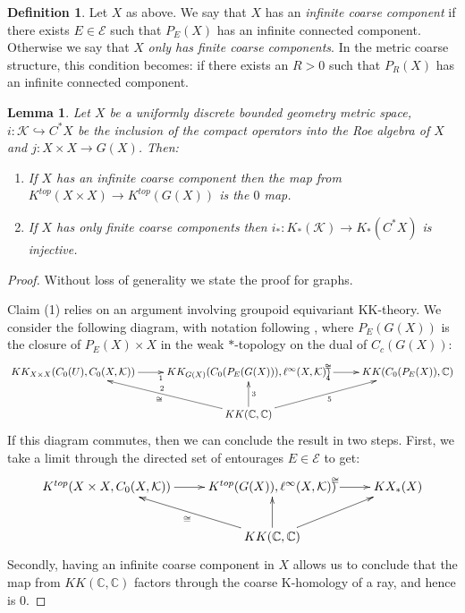 \documentclass[11pt]{amsart}
\theoremstyle{plain}
\newtheorem{lemma}[theorem]{Lemma}%
\theoremstyle{definition}%
\newtheorem{definition}[theorem]{Definition}%
\theoremstyle{remark}%
\begin{document}
{\begin{definition}
Let $X$ as above. We say that $X$ has an \textit{infinite coarse component} if there exists $E \in \mathcal{E}$ such that $P_{E}(X)$ has an infinite connected component. Otherwise we say that $X$ \textit{only has finite coarse components}. In the metric coarse structure, this condition becomes: if there exists an $R>0$ such that $P_{R}(X)$ has an infinite connected component.
\end{definition}

\begin{lemma}\label{lem:zandi}
Let $X$ be a uniformly discrete bounded geometry metric space, $i: \mathcal{K} \hookrightarrow C^{*}X$ be the inclusion of the compact operators into the Roe algebra of $X$ and $j:X\times X \rightarrow G(X)$. Then:
\begin{enumerate}
\item If $X$ has an infinite coarse component then the map from $K^{top}(X \times X) \rightarrow K^{top}(G(X))$ is the $0$ map.
\item If $X$ has only finite coarse components then $i_{*}:K_{*}(\mathcal{K}) \rightarrow K_{*}(C^{*}X)$ is injective.
\end{enumerate}
\end{lemma}
\begin{proof}
Without loss of generality we state the proof for graphs. 

Claim (1) relies on an argument involving groupoid equivariant KK-theory. We consider the following diagram, with notation following \cite{}, where $P_{E}(G(X))$ is the closure of $P_{E}(X)\times X$ in the weak $*$-topology on the dual of $C_{c}(G(X))$:
\begin{equation*}
\xymatrix{KK_{X\times X}(C_{0}(U),C_{0}(X,\mathcal{K})) \ar[r]_{1} & KK_{G(X)}(C_{0}(P_{E}(G(X))),\ell^{\infty}(X,\mathcal{K})) \ar[r]^{\cong}_{4}  & KK(C_{0}(P_{E}(X)),\mathbb{C}) \\
& KK(\mathbb{C},\mathbb{C}) \ar^{\cong}_{2}[lu]\ar[u]_{3}\ar[ur]_{5}&
}
\end{equation*}
If this diagram commutes, then we can conclude the result in two steps. First, we take a limit through the directed set of entourages $E \in \mathcal{E}$ to get:
\begin{equation*}
\xymatrix{K^{top}(X \times X, C_{0}(X,\mathcal{K})) \ar[r] & K^{top}(G(X)),\ell^{\infty}(X,\mathcal{K})) \ar[r]^{\cong}  & KX_{*}(X) \\
& KK(\mathbb{C},\mathbb{C}) \ar^{\cong}[lu]\ar[u]\ar[ur]&
}
\end{equation*}
Secondly, having an infinite coarse component in $X$ allows us to conclude that the map from $KK(\mathbb{C},\mathbb{C})$ factors through the coarse K-homology of a ray, and hence is $0$.


\end{proof}}
\end{document}
